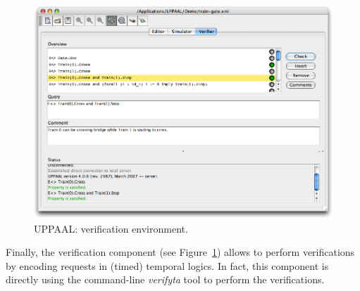 \begin{figure}[htbp]
    \centering
    \includegraphics[width=\textwidth]{content/timed-automata/uppaal-3}
    \caption{UPPAAL: verification environment.}
    \label{fig:uppaal-3}
\end{figure}

Finally, the verification component (see Figure~\ref{fig:uppaal-3}) allows to perform verifications by encoding requests in (timed) temporal logics. In fact, this component is directly using the command-line \emph{verifyta} tool to perform the verifications.\\


